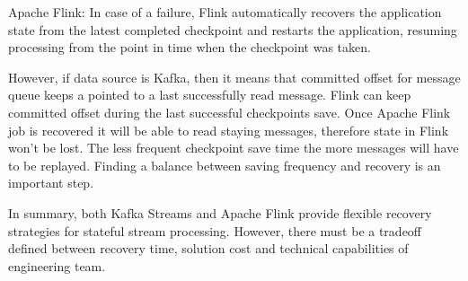 \begin{description}
    Apache Flink: In case of a failure, Flink automatically recovers the application
    state from the latest completed checkpoint and restarts the application,
    resuming processing from the point in time when the checkpoint was taken.

    However, if data source is Kafka, then it means that committed offset for message queue
    keeps a pointed to a last successfully read message.
    Flink can keep committed offset during the last successful checkpoints save.
    Once Apache Flink job is recovered it will be able to read staying messages,
    therefore state in Flink won't be lost.
    The less frequent checkpoint save time the more messages will have to be replayed.
    Finding a balance between saving frequency and recovery is an important step.

\end{description}

In summary, both Kafka Streams and Apache Flink provide flexible recovery strategies
for stateful stream processing.
However, there must be a tradeoff defined between recovery time, solution cost and
technical capabilities of engineering team.